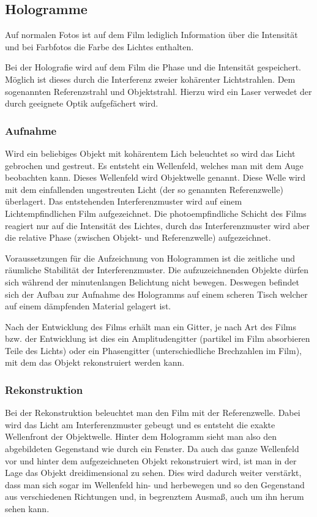 \documentclass[12pt]{article}
\begin{document}
\subsection{Hologramme}
Auf normalen Fotos ist auf dem Film lediglich Information über die Intensität und bei Farbfotos die Farbe des Lichtes enthalten.

Bei der Holografie wird auf dem Film die Phase und die Intensität gespeichert. Möglich ist dieses durch die Interferenz zweier kohärenter Lichtstrahlen.
Dem sogenannten Referenzstrahl und Objektstrahl. Hierzu wird ein Laser verwedet der durch geeignete Optik aufgefächert wird.
\subsubsection{Aufnahme}
Wird ein beliebiges Objekt mit kohärentem Lich beleuchtet so wird das Licht gebrochen und gestreut. Es entsteht ein Wellenfeld, welches man mit dem Auge
beobachten kann. Dieses Wellenfeld wird Objektwelle genannt. Diese Welle wird mit dem einfallenden ungestreuten Licht (der so genannten Referenzwelle)
überlagert. Das entstehenden Interferenzmuster wird auf einem Lichtempfindlichen Film aufgezeichnet. Die photoempfindliche Schicht des Films reagiert nur auf
die Intensität des Lichtes, durch das Interferenzmuster wird aber die relative Phase (zwischen Objekt- und Referenzwelle) aufgezeichnet.

Voraussetzungen für die Aufzeichnung von Hologrammen ist die zeitliche und räumliche Stabilität der Interferenzmuster. Die aufzuzeichnenden Objekte dürfen
sich während der minutenlangen Belichtung nicht bewegen. Deswegen befindet sich der Aufbau zur Aufnahme des Hologramms auf einem scheren Tisch welcher auf 
einem dämpfenden Material gelagert ist. 

Nach der Entwicklung des Films erhält man ein Gitter, je nach Art des Films bzw. der Entwicklung ist dies ein Amplitudengitter (partikel im Film absorbieren
Teile des Lichts) oder ein Phasengitter (unterschiedliche Brechzahlen im Film), mit dem das Objekt rekonstruiert werden kann.

\subsubsection{Rekonstruktion}
Bei der Rekonstruktion beleuchtet man den Film mit der Referenzwelle. Dabei wird das Licht am Interferenzmuster gebeugt und es entsteht die exakte
Wellenfront der Objektwelle. Hinter dem Hologramm sieht man also den abgebildeten Gegenstand wie durch ein Fenster.
Da auch das ganze Wellenfeld vor und hinter dem aufgezeichneten Objekt rekonstruiert wird, ist man in der Lage das Objekt dreidimensional zu sehen. Dies
wird dadurch weiter verstärkt, dass man sich sogar im Wellenfeld hin- und herbewegen und so den Gegenstand aus verschiedenen Richtungen und, in begrenztem
Ausmaß, auch um ihn herum sehen kann.
\end{document}
